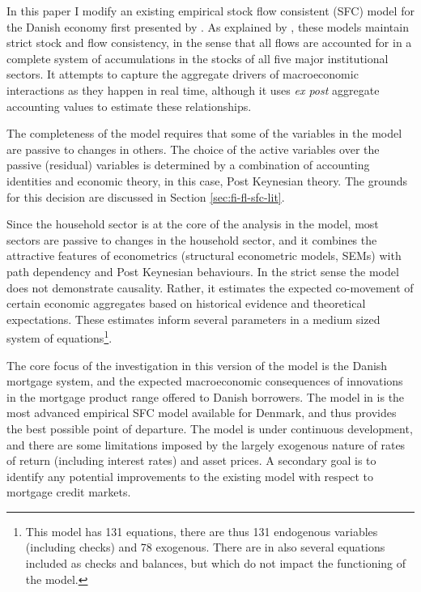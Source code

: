 \documentclass[
]{book}
\begin{document}
In this paper I modify an existing empirical stock flow consistent (SFC) model for the Danish economy first presented by \citet{byrialsenraza2019empirical}. As explained by \citet{godleylavoie2012}, these models maintain strict stock and flow consistency, in the sense that all flows are accounted for in a complete system of accumulations in the stocks of all five major institutional sectors. It attempts to capture the aggregate drivers of macroeconomic interactions as they happen in real time, although it uses \emph{ex post} aggregate accounting values to estimate these relationships.

The completeness of the model requires that some of the variables in the model are passive to changes in others. The choice of the active variables over the passive (residual) variables is determined by a combination of accounting identities and economic theory, in this case, Post Keynesian theory. The grounds for this decision are discussed in Section \ref{sec:fi-fl-sfc-lit}.

Since the household sector is at the core of the analysis in the model, most sectors are passive to changes in the household sector, and it combines the attractive features of econometrics (structural econometric models, SEMs) with path dependency and Post Keynesian behaviours. In the strict sense the model does not demonstrate causality. Rather, it estimates the expected co-movement of certain economic aggregates based on historical evidence and theoretical expectations. These estimates inform several parameters in a medium sized system of equations\footnote{This model has 131 equations, there are thus 131 endogenous variables (including checks) and 78 exogenous. There are in also several equations included as checks and balances, but which do not impact the functioning of the model.}.

The core focus of the investigation in this version of the model is the Danish mortgage system, and the expected macroeconomic consequences of innovations in the mortgage product range offered to Danish borrowers. The model in \citet{byrialsenraza2019empirical} is the most advanced empirical SFC model available for Denmark, and thus provides the best possible point of departure. The model is under continuous development, and there are some limitations imposed by the largely exogenous nature of rates of return (including interest rates) and asset prices. A secondary goal is to identify any potential improvements to the existing model with respect to mortgage credit markets.
\end{document}
